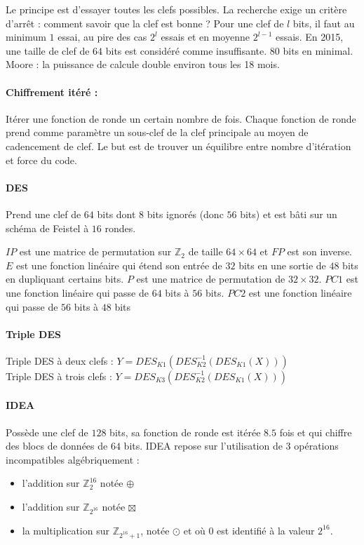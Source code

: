 \documentclass[11pt,a4paper]{report}
\begin{document}
Le principe est d'essayer toutes les clefs possibles. La recherche exige un critère d'arrêt : comment savoir que la clef est bonne ? Pour une clef de $l$ bits, il faut au minimum $1$ essai, au pire des cas $2^l$ essais et en moyenne $2^{l-1}$ essais. En 2015, une taille de clef de $64$ bits est considéré comme insuffisante. $80$ bits en minimal. Moore : la puissance de calcule double environ tous les 18 mois.

\paragraph*{Chiffrement itéré :}

Itérer une fonction de ronde un certain nombre de fois. Chaque fonction de ronde prend comme paramètre un sous-clef de la clef principale au moyen de cadencement de clef. Le but est de trouver un équilibre entre nombre d'itération et force du code.

\paragraph*{DES}

Prend une clef de $64$ bits dont $8$ bits ignorés (donc $56$ bits) et est bâti sur un schéma de Feistel à $16$ rondes.

$IP$ est une matrice de permutation sur $\mathbb{Z}_2$ de taille $64 \times 64$ et $FP$ est son inverse. $E$ est une fonction linéaire qui étend son entrée de $32$ bits en une sortie de $48$ bits en dupliquant certains bits. $P$ est une matrice de permutation de $32 \times 32$. $PC1$ est une fonction linéaire qui passe de $64$ bits à $56$ bits. $PC2$ est une fonction linéaire qui passe de $56$ bits à $48$ bits

\paragraph*{Triple DES}

Triple DES à deux clefs  : $Y = DES_{K1}(DES_{K2}^{-1}(DES_{K1}(X)))$ \\
Triple DES à trois clefs : $Y = DES_{K3}(DES_{K2}^{-1}(DES_{K1}(X)))$

\paragraph*{IDEA}

Possède une clef de $128$ bits, sa fonction de ronde est itérée $8.5$ fois et qui chiffre des blocs de données de $64$ bits. IDEA repose sur l'utilisation de 3 opérations incompatibles algébriquement :
\begin{itemize}
    \item l'addition sur $\mathbb{Z}^{16}_2$ notée $\oplus$
    \item l'addition sur $\mathbb{Z}_{2^{16}}$ notée $\boxtimes$
    \item la multiplication sur $\mathbb{Z}_{2^{16}+1}$, notée $\odot$ et où $0$ est identifié à la valeur $2^{16}$.
\end{itemize}
\end{document}
